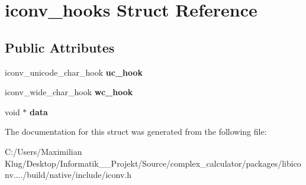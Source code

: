 \hypertarget{structiconv__hooks}{}\section{iconv\+\_\+hooks Struct Reference}
\label{structiconv__hooks}
\subsection*{Public Attributes}
\begin{DoxyCompactItemize}
\item 
\mbox{\label{structiconv__hooks_ad08282e89f8d2fc613836b950c75f9a1}} 
iconv\+\_\+unicode\+\_\+char\+\_\+hook {\bfseries uc\+\_\+hook}
\item 
\mbox{\label{structiconv__hooks_a747ecdaa04c197f92f7fb54a76970b7f}} 
iconv\+\_\+wide\+\_\+char\+\_\+hook {\bfseries wc\+\_\+hook}
\item 
\mbox{\label{structiconv__hooks_ab24741c8095acbc326b1f373bb52aabc}} 
void $\ast$ {\bfseries data}
\end{DoxyCompactItemize}


The documentation for this struct was generated from the following file\+:\begin{DoxyCompactItemize}
\item 
C\+:/\+Users/\+Maximilian Klug/\+Desktop/\+Informatik\+\_\+\_\+\+Projekt/\+Source/complex\+\_\+calculator/packages/libiconv..../build/native/include/iconv.\+h\end{DoxyCompactItemize}
